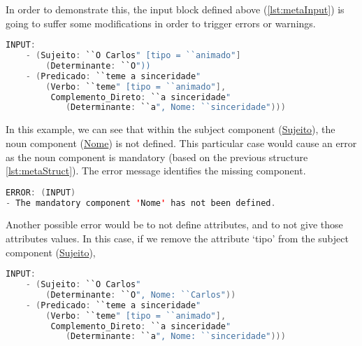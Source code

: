 In order to demonstrate this, the input block defined above (\autoref{lst:metaInput}) is going to suffer some modifications in order to trigger errors or warnings.

\begin{center}
\begin{minipage}{13cm}
\begin{lstlisting}[language=java, basicstyle=\small, label={lst:meta_input_missing_comp}, caption=Example of the students parsing with missing component]
INPUT:
    - (Sujeito: ``O Carlos" [tipo = ``animado"]
        (Determinante: ``O"))
    - (Predicado: ``teme a sinceridade" 
        (Verbo: ``teme" [tipo = ``animado"], 
         Complemento_Direto: ``a sinceridade" 
            (Determinante: ``a", Nome: ``sinceridade")))
\end{lstlisting}
\end{minipage}
\end{center}

In this example, we can see that within the subject component (\underline{Sujeito}), the noun component (\underline{Nome}) is not defined. 
This particular case would cause an error as the noun component is mandatory (based on the previous structure \autoref{lst:metaStruct}). 
The error message identifies the missing component.

\begin{center}
\begin{minipage}{13cm}
\begin{lstlisting}[language=java, basicstyle=\small, label={lst:err_msg_missing_comp}, caption=Example error message of missing component]
ERROR: (INPUT) 
- The mandatory component 'Nome' has not been defined.
\end{lstlisting}
\end{minipage}
\end{center}
Another possible error would be to not define attributes, and to not give those attributes values. In this case, if we remove the attribute ‘tipo’ from the subject 
component (\underline{Sujeito}),

\begin{center}
\begin{minipage}{13cm}
\begin{lstlisting}[language=java, basicstyle=\small, label={lst:meta_input_missing_attr}, caption=Example of the students parsing with missing attribute]
INPUT:
    - (Sujeito: ``O Carlos"
        (Determinante: ``O", Nome: ``Carlos"))
    - (Predicado: ``teme a sinceridade" 
        (Verbo: ``teme" [tipo = ``animado"], 
         Complemento_Direto: ``a sinceridade" 
            (Determinante: ``a", Nome: ``sinceridade")))
\end{lstlisting}
\end{minipage}
\end{center}

